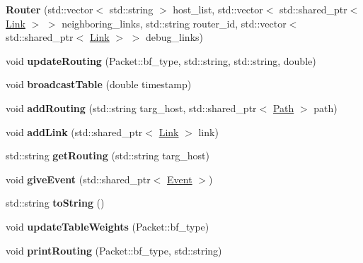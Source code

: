 \begin{DoxyCompactItemize}
\item 
\hypertarget{classRouter_a217136993163bb16e326d65443670197}{{\bfseries \-Router} (std\-::vector$<$ std\-::string $>$ host\-\_\-list, std\-::vector$<$ std\-::shared\-\_\-ptr$<$ \hyperlink{classLink}{\-Link} $>$ $>$ neighboring\-\_\-links, std\-::string router\-\_\-id, std\-::vector$<$ std\-::shared\-\_\-ptr$<$ \hyperlink{classLink}{\-Link} $>$ $>$ debug\-\_\-links)}\label{classRouter_a217136993163bb16e326d65443670197}

\item 
\hypertarget{classRouter_ae1435286d9572cbf0de11fa3c937ca9a}{void {\bfseries update\-Routing} (\-Packet\-::bf\-\_\-type, std\-::string, std\-::string, double)}\label{classRouter_ae1435286d9572cbf0de11fa3c937ca9a}

\item 
\hypertarget{classRouter_a0b106e96412284611079588b65721aa6}{void {\bfseries broadcast\-Table} (double timestamp)}\label{classRouter_a0b106e96412284611079588b65721aa6}

\item 
\hypertarget{classRouter_a923848a34881212d310a738032d31610}{void {\bfseries add\-Routing} (std\-::string targ\-\_\-host, std\-::shared\-\_\-ptr$<$ \hyperlink{classPath}{\-Path} $>$ path)}\label{classRouter_a923848a34881212d310a738032d31610}

\item 
\hypertarget{classRouter_aa28dfae66a6e2587d3c39da83059a866}{void {\bfseries add\-Link} (std\-::shared\-\_\-ptr$<$ \hyperlink{classLink}{\-Link} $>$ link)}\label{classRouter_aa28dfae66a6e2587d3c39da83059a866}

\item 
\hypertarget{classRouter_a2c333b431ae61349b91277cda82a3f5e}{std\-::string {\bfseries get\-Routing} (std\-::string targ\-\_\-host)}\label{classRouter_a2c333b431ae61349b91277cda82a3f5e}

\item 
\hypertarget{classRouter_aed4bdd88f4fa09cb784c5c329c935688}{void {\bfseries give\-Event} (std\-::shared\-\_\-ptr$<$ \hyperlink{classEvent}{\-Event} $>$)}\label{classRouter_aed4bdd88f4fa09cb784c5c329c935688}

\item 
\hypertarget{classRouter_aa54f568dd950bcb0feae508e3c75889d}{std\-::string {\bfseries to\-String} ()}\label{classRouter_aa54f568dd950bcb0feae508e3c75889d}

\item 
\hypertarget{classRouter_a323a820ddc17ea36834cf3316510ec5c}{void {\bfseries update\-Table\-Weights} (\-Packet\-::bf\-\_\-type)}\label{classRouter_a323a820ddc17ea36834cf3316510ec5c}

\item 
\hypertarget{classRouter_a81641d4aac06367d991e3218151de515}{void {\bfseries print\-Routing} (\-Packet\-::bf\-\_\-type, std\-::string)}\label{classRouter_a81641d4aac06367d991e3218151de515}

\end{DoxyCompactItemize}


